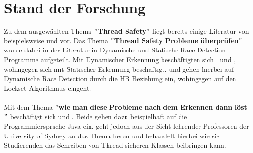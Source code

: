 \chapter{Stand der Forschung}

Zu dem ausgewählten Thema $"$\textbf{Thread Safety}$"$ liegt bereits einige Literatur von beispielsweise \textcite{li_efficient_2019} und \textcite{erickson_effective_nodate} vor. Das Thema $"$\textbf{Thread Safety Probleme überprüfen}$"$ wurde dabei in der Literatur in Dynamische und Statische Race Detection Programme aufgeteilt. Mit Dynamischer Erkennung beschäftigten sich \textcite{li_efficient_2019}, \textcite{erickson_effective_nodate} und \textcite{savage_eraser_nodate}, wohingegen sich  \textcite{relay} mit Statischer Erkennung beschäftigt. \textcite{li_efficient_2019} und \textcite{erickson_effective_nodate} gehen hierbei auf Dynamische Race Detection durch die \ac{HB} Beziehung ein, wohingegen \textcite{savage_eraser_nodate} auf den Lockset Algorithmus eingeht.\\
\\
Mit dem Thema $"$\textbf{wie man diese Probleme nach dem Erkennen dann löst}$"$ beschäftigt sich \textcite{brian} und \textcite{fekete_teaching_nodate}. Beide gehen dazu beispielhaft auf die Programmiersprache Java ein. \textcite{fekete_teaching_nodate} geht jedoch aus der Sicht lehrender Professoren der University of Sydney an das Thema heran und behandelt hierbei wie sie Studierenden das Schreiben von Thread sicheren Klassen beibringen kann.